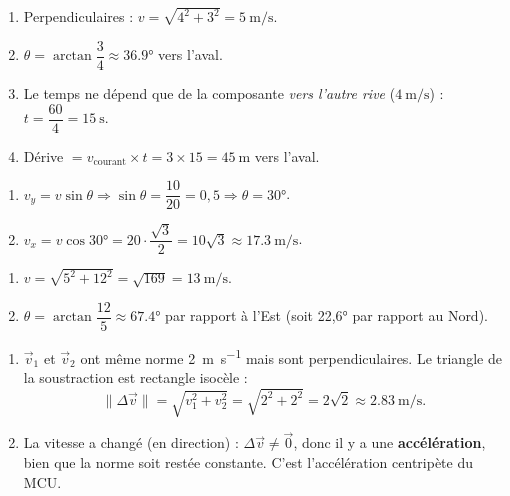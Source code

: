\documentclass[11pt,a4paper]{article}
\newcommand{\vv}[1]{\vec{#1}}\newcommand{\ds}{\displaystyle}
\begin{document}

\begin{corrige}
\begin{enumerate}[label=\alph*)]
  \item Perpendiculaires : $v=\sqrt{4^2+3^2}=\qty{5}{\metre\per\second}$.
  \item $\theta=\arctan\dfrac{3}{4}\approx\ang{36,9}$ vers l'aval.
  \item Le temps ne dépend que de la composante \emph{vers l'autre rive} ($\qty{4}{\metre\per\second}$) : $t=\dfrac{60}{4}=\qty{15}{\second}$.
  \item Dérive $=v_{\text{courant}}\times t=3\times15=\qty{45}{\metre}$ vers l'aval.
\end{enumerate}
\end{corrige}

\begin{corrige}
\begin{enumerate}[label=\alph*)]
  \item $v_y=v\sin\theta \Rightarrow \sin\theta=\dfrac{10}{20}=0{,}5 \Rightarrow \theta=\ang{30}$.
  \item $v_x=v\cos\ang{30}=20\cdot\dfrac{\sqrt3}{2}=10\sqrt3\approx\qty{17,3}{\metre\per\second}$.
\end{enumerate}
\end{corrige}

\begin{corrige}
\begin{enumerate}[label=\alph*)]
  \item $v=\sqrt{5^2+12^2}=\sqrt{169}=\qty{13}{\metre\per\second}$.
  \item $\theta=\arctan\dfrac{12}{5}\approx\ang{67,4}$ par rapport à l'Est (soit \ang{22,6} par rapport au Nord).
\end{enumerate}
\end{corrige}

\begin{corrige}
\begin{enumerate}[label=\alph*)]
  \item $\vv{v}_1$ et $\vv{v}_2$ ont même norme \qty{2}{\metre\per\second} mais sont perpendiculaires. Le triangle de la soustraction est rectangle isocèle :
        \[ \lVert\Delta\vv{v}\rVert=\sqrt{v_1^2+v_2^2}=\sqrt{2^2+2^2}=2\sqrt2\approx\qty{2,83}{\metre\per\second}. \]
  \item La vitesse a changé (en direction) : $\Delta\vv{v}\neq\vv{0}$, donc il y a une \textbf{accélération}, bien que la norme soit restée constante. C'est l'accélération centripète du MCU.
\end{enumerate}
\end{corrige}
\end{document}
